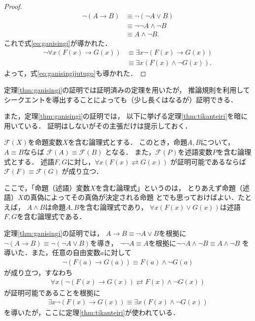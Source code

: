    \begin{proof}
     \begin{align*}
       \lnot ( A \to B ) & \equiv \lnot ( \lnot A \lor B) \\
       & \equiv \lnot \lnot A \land \lnot B \\
       & \equiv A \land \lnot B .
     \end{align*}
     これで式\eqref{eq:ganisingi}が導かれた．
     \begin{align*}
       \lnot \forall x ( F(x) \to G(x) ) 
       & \equiv \exists x \lnot ( F(x) \to G(x) ) \\
       & \equiv \exists x ( F(x) \land \lnot G(x) ).
     \end{align*}
     よって，式\eqref{eq:ganisingijutugo}も導かれた．
   \end{proof}
   定理\ref{thm:ganisingi}の証明では証明済みの定理を用いたが，
   推論規則を利用して
   シークエントを導出することによっても（少し長くはなるが）証明できる．

   また，定理\ref{thm:ganisingi}の証明では，
   以下に挙げる定理\ref{thm:tikanteiri}を暗に用いている．
   証明はしないがその主張だけは提示しておく．
   \begin{thm}[置換定理] \label{thm:tikanteiri}
     $\mathscr{F}(X)$を命題変数$X$を含む論理式とする．
     このとき，命題$A,B$について，$A \equiv B$ならば
     $\mathscr{F}(A) \equiv \mathscr{F}(B)$
     となる．
     また，$\mathscr{F}(P)$を述語変数$P$を含む論理式とする．
     述語$F,G$に対し，$\forall x (F(x) \rightleftarrows G(x))$
     が証明可能であるならば$\mathscr{F}(F) \equiv \mathscr{F}(G)$
     が成り立つ．
   \end{thm}
   ここで，「命題（述語）変数$X$を含む論理式」というのは，
   とりあえず命題（述語）$X$の真偽によってその真偽が決定される命題
   とでも思っておけばよい．たとえば，
   $A \land B$は命題$A,B$を含む論理式であり，
   $\forall x (F(x) \lor G(x))$は述語$F,G$を含む論理式である．

   定理\ref{thm:ganisingi}の証明では，
   $A \to B \equiv \lnot A \lor B$を根拠に
   $\lnot ( A \to B) \equiv \lnot ( \lnot A \lor B)$を導き，
   $\lnot \lnot A \equiv A$を根拠に$\lnot \lnot A \land \lnot B \equiv A \land \lnot B$
   を導いた．また，任意の自由変数$a$に対して
   \begin{align*}
     \lnot ( F(a) \to G(a) ) \equiv F(a) \land \lnot G(a) 
   \end{align*}
   が成り立つ，すなわち
   \begin{align*}
     \forall x ( \lnot ( F(x) \to G(x) ) \rightleftarrows F(x) \land \lnot G(x) )
   \end{align*}
   が証明可能であることを根拠に
   \begin{align*}
     \exists x \lnot ( F(x) \to G(x) ) \equiv \exists x ( F(x) \land \lnot G(x) )
   \end{align*}
   を導いたが，ここに定理\ref{thm:tikanteiri}が使われている．

